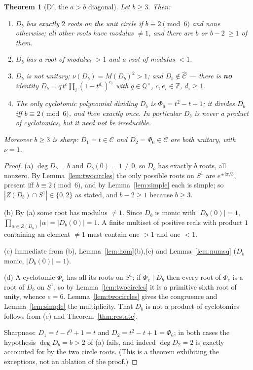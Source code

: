 \documentclass[11pt]{article}
\newtheorem{theorem}{Theorem}[section]
\theoremstyle{definition}
\newcommand{\ZZ}{\mathbb{Z}}
\newcommand{\QQ}{\mathbb{Q}}
\newcommand{\Chat}{\widehat{\mathcal{C}}}
\newcommand{\Scirc}{S^1}
\begin{document}
\begin{theorem}[D$'$, the $a>b$ diagonal]\label{thm:Dprime}
Let $b\ge3$. Then:
\begin{enumerate}
\item[(a)] $D_b$ has exactly $2$ roots on the unit circle if $b\equiv2\pmod6$ and none otherwise;
all other roots have modulus $\ne1$, and there are $b$ or $b-2\ \ge1$ of them.
\item[(b)] $D_b$ has a root of modulus $>1$ and a root of modulus $<1$.
\item[(c)] $D_b$ is not unitary; $\nu(D_b)=M(D_b)^{2}>1$; and
      $D_b\notin\Chat$ --- there is \textbf{no} identity
      $D_b=q\,t^{c}\prod_i(1-t^{d_i})^{e_i}$ with $q\in\QQ^\times$, $c,e_i\in\ZZ$, $d_i\ge1$.
\item[(d)] The only cyclotomic polynomial dividing $D_b$ is $\Phi_6=t^2-t+1$; it divides $D_b$
      iff $b\equiv2\pmod6$, and then exactly once. In particular $D_b$ is never a product of
      cyclotomics, but it need not be irreducible.
\end{enumerate}
Moreover $b\ge3$ is sharp: $D_1=t\in\mathcal{C}$ and $D_2=\Phi_6\in\mathcal{C}$ are both unitary,
with $\nu=1$.
\end{theorem}

\begin{proof}
(a) $\deg D_b=b$ and $D_b(0)=1\ne0$, so $D_b$ has exactly $b$ roots, all nonzero. By
Lemma~\ref{lem:twocircles} the only possible roots on $\Scirc$ are $e^{\pm i\pi/3}$, present iff
$b\equiv2\pmod6$, and by Lemma~\ref{lem:simple} each is simple; so $|Z(D_b)\cap \Scirc|\in\{0,2\}$ as
stated, and $b-2\ge1$ because $b\ge3$.

(b) By (a) some root has modulus $\ne1$. Since $D_b$ is monic with $|D_b(0)|=1$,
$\prod_{\alpha\in Z(D_b)}|\alpha|=|D_b(0)|=1$. A finite multiset of positive reals with product
$1$ containing an element $\ne1$ must contain one $>1$ and one $<1$.

(c) Immediate from (b), Lemma~\ref{lem:hom}(b),(c) and Lemma~\ref{lem:numsq}
($D_b$ monic, $|D_b(0)|=1$).

(d) A cyclotomic $\Phi_e$ has all its roots on $\Scirc$; if $\Phi_e\mid D_b$ then every root of
$\Phi_e$ is a root of $D_b$ on $\Scirc$, so by Lemma~\ref{lem:twocircles} it is a primitive sixth
root of unity, whence $e=6$. Lemma~\ref{lem:twocircles} gives the congruence and
Lemma~\ref{lem:simple} the multiplicity. That $D_b$ is not a product of cyclotomics follows from
(c) and Theorem~\ref{thm:restate}.

Sharpness: $D_1=t-t^{0}+1=t$ and $D_2=t^2-t+1=\Phi_6$; in both cases the hypothesis
$\deg D_b=b>2$ of (a) fails, and indeed $\deg D_2=2$ is exactly accounted for by the two circle
roots. (This is a theorem exhibiting the exceptions, not an ablation of the proof.)
\end{proof}
\end{document}
